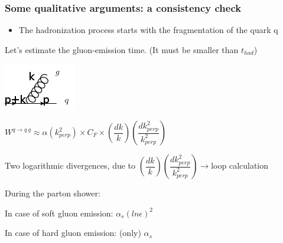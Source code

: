 \documentclass[9pt, xcolor=dvipsnames]{beamer}
\begin{document}
\begin{frame}
\frametitle{Some qualitative arguments: a consistency check}
\begin{itemize}
 \item The hadronization process starts with the fragmentation of the quark q
\end{itemize}

\pause
Let's estimate the gluon-emission time. (It must be smaller than $t_{had}$)

\medskip
\begin{block}{}
\begin{minipage}{.25\columnwidth}
\begin{center}
 \includegraphics[scale=0.3]{emission}
\end{center}
\end{minipage}
\begin{minipage}{.7\columnwidth}
$W^{q\rightarrow q ~g}\approx\alpha(k^{2}_{perp})\times C_{F}\times(\dfrac{dk}{k})(\dfrac{dk^{2}_{perp}}{k^{2}_{perp}})$
\end{minipage}
\end{block}

\medskip
Two logarithmic divergences, due to $(\dfrac{dk}{k})(\dfrac{dk^{2}_{perp}}{k^{2}_{perp}})\rightarrow$loop calculation
\pause
\medskip
\begin{block}{During the parton shower:}
\begin{center}
In case of soft gluon emission: $\alpha_{s} (ln\epsilon)^{2}$
\end{center}
\begin{center}
 In case of hard gluon emission: (only) $\alpha_{s}$
\end{center}
\end{block}


\end{frame}
\end{document}
